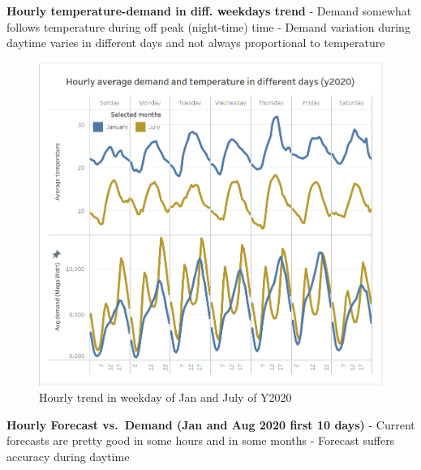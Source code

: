 \documentclass[mstat,12pt]{unswthesis}
\begin{document}
\textbf{Hourly temperature-demand in diff. weekdays trend} \newline
\newline - Demand somewhat follows temperature during off peak
(night-time) time \newline - Demand variation during daytime varies in
different days and not always proportional to temperature \newline

\begin{figure}[H]
\includegraphics{snapshots1/Hourly trend in weekday of Jan and July of Y2020.png}
\caption{Hourly trend in weekday of Jan and July of Y2020}\label{4.5}
\end{figure}

\textbf{Hourly Forecast vs.~Demand (Jan and Aug 2020 first 10 days)}
\newline \newline - Current forecasts are pretty good in some hours and
in some months \newline - Forecast suffers accuracy during daytime
\newline
\end{document}
